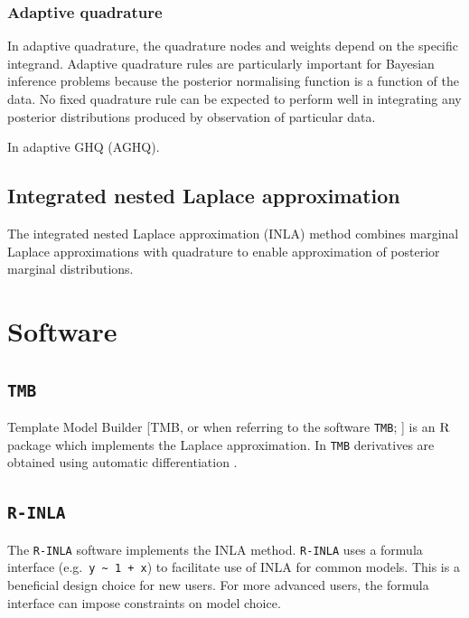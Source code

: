 \documentclass[a4paper, nobind]{templates/ociamthesis}
\begin{document}
\hypertarget{adaptive-quadrature}{%
\subsubsection{Adaptive quadrature}\label{adaptive-quadrature}}

In adaptive quadrature, the quadrature nodes and weights depend on the specific integrand.
Adaptive quadrature rules are particularly important for Bayesian inference problems because the posterior normalising function is a function of the data.
No fixed quadrature rule can be expected to perform well in integrating any posterior distributions produced by observation of particular data.

In adaptive GHQ (AGHQ).

\hypertarget{integrated-nested-laplace-approximation}{%
\subsection{Integrated nested Laplace approximation}\label{integrated-nested-laplace-approximation}}

The integrated nested Laplace approximation (INLA) method \autocite{rue2009approximate} combines marginal Laplace approximations with quadrature to enable approximation of posterior marginal distributions.

\hypertarget{software}{%
\section{Software}\label{software}}

\hypertarget{tmb}{%
\subsection{\texorpdfstring{\texttt{TMB}}{TMB}}\label{tmb}}

Template Model Builder {[}TMB, or when referring to the software \texttt{TMB}; \textcite{kristensen2016tmb}{]} is an \(\textsc{R}\) package which implements the Laplace approximation.
In \texttt{TMB} derivatives are obtained using automatic differentiation \autocite{baydin2017automatic}.

\hypertarget{r-inla}{%
\subsection{\texorpdfstring{\texttt{R-INLA}}{R-INLA}}\label{r-inla}}

The \texttt{R-INLA} software implements the INLA method.
\texttt{R-INLA} uses a formula interface (e.g.~\texttt{y\ \textasciitilde{}\ 1\ +\ x}) to facilitate use of INLA for common models.
This is a beneficial design choice for new users.
For more advanced users, the formula interface can impose constraints on model choice.
\end{document}
